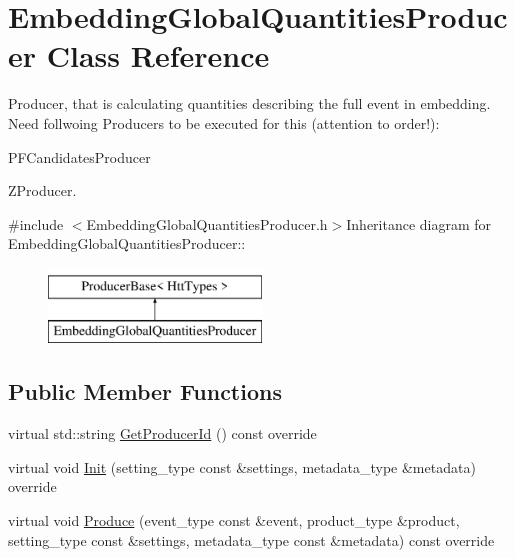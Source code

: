 \hypertarget{classEmbeddingGlobalQuantitiesProducer}{
\section{EmbeddingGlobalQuantitiesProducer Class Reference}
\label{classEmbeddingGlobalQuantitiesProducer}
}


Producer, that is calculating quantities describing the full event in embedding. Need follwoing Producers to be executed for this (attention to order!):
\begin{DoxyItemize}
\item PFCandidatesProducer
\item ZProducer. 
\end{DoxyItemize} 


{\ttfamily \#include $<$EmbeddingGlobalQuantitiesProducer.h$>$}Inheritance diagram for EmbeddingGlobalQuantitiesProducer::\begin{figure}[H]
\begin{center}
\leavevmode
\includegraphics[height=2cm]{classEmbeddingGlobalQuantitiesProducer}
\end{center}
\end{figure}
\subsection*{Public Member Functions}
\begin{DoxyCompactItemize}
\item 
virtual std::string \hyperlink{classEmbeddingGlobalQuantitiesProducer_acc5b530d1c375f0508c5b0348e651481}{GetProducerId} () const override
\item 
virtual void \hyperlink{classEmbeddingGlobalQuantitiesProducer_a21a081a1b3182777ebf179aded3f0cc7}{Init} (setting\_\-type const \&settings, metadata\_\-type \&metadata) override
\item 
virtual void \hyperlink{classEmbeddingGlobalQuantitiesProducer_a05b0572f8e6ba73bc73f3ea0958e5210}{Produce} (event\_\-type const \&event, product\_\-type \&product, setting\_\-type const \&settings, metadata\_\-type const \&metadata) const override
\end{DoxyCompactItemize}


